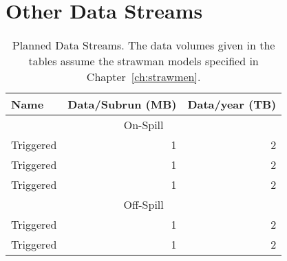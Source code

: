 \section{Other Data Streams}
\label{sec:Other_data_streams}

\begin{table}
\begin{center}
  \caption[Planned Data Streams]{Planned Data Streams. The data volumes given in the tables
    assume the strawman models specified in Chapter~\ref{ch:strawmen}.}
\label{tab:externalmilestones}
\begin{tabular}{lrr}\hline
  Name & Data/Subrun (MB) & Data/year (TB) \\ \hline
  \multicolumn{3}{c}{On-Spill} \\
 Triggered &  1 & 2 \\
 Triggered &  1 & 2 \\
 Triggered &  1 & 2 \\ \hline 
  \multicolumn{3}{c}{Off-Spill} \\
 Triggered &  1 & 2 \\
 Triggered &  1 & 2 \\
\hline 
  \end{tabular}
\end{center}
\end{table}
